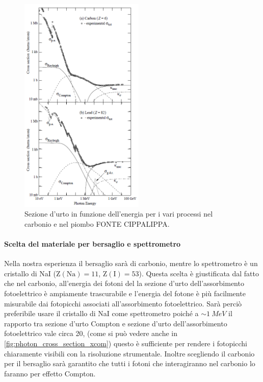   \begin{figure}[h]
 	\centering
 	\includegraphics[width=16em]{cross_section_photon_pdg}
 	\caption{\label{fig:photon_cross_section_pdg}Sezione d'urto in funzione dell'energia per i vari processi nel carbonio e nel piombo FONTE CIPPALIPPA.}
 \end{figure}

 \paragraph{Scelta del materiale per bersaglio e spettrometro}
 Nella nostra esperienza il bersaglio sarà di carbonio, mentre lo spettrometro è un cristallo di NaI ($\text{Z}(\text{Na})=11$, $\text{Z}(\text{I})=53$). Questa scelta è giustificata dal fatto che nel carbonio, all'energia dei fotoni del \co\; la sezione d'urto dell'assorbimento fotoelettrico è ampiamente trascurabile e l'energia del fotone è più facilmente misurabile dai fotopicchi associati all'assorbimento fotoelettrico. Sarà perciò preferibile usare il cristallo di NaI come spettrometro poiché a $\sim\SI{1}{MeV}$ il rapporto tra sezione d'urto Compton e sezione d'urto dell'assorbimento fotoelettrico vale circa 20, (come si può vedere anche in \autoref{fig:photon_cross_section_xcom}) questo è sufficiente per rendere i fotopicchi chiaramente visibili con la risoluzione strumentale. Inoltre scegliendo il carbonio per il bersaglio  sarà garantito che tutti i fotoni che interagiranno nel carbonio lo faranno per effetto Compton.
 
 
